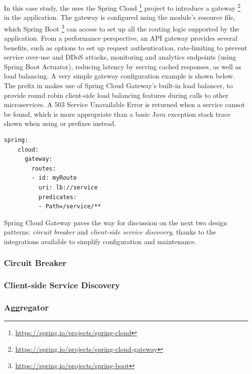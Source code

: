 In this case study, the  uses the Spring Cloud \footnote{\url{https://spring.io/projects/spring-cloud}} project to introduce a gateway \footnote{\url{https://spring.io/projects/spring-cloud-gateway}} in the application. The gateway is configured using the module's  resource file, which Spring Boot \footnote{\url{https://spring.io/projects/spring-boot}} can access to set up all the routing logic supported by the application. From a performance perspective, an API gateway provides several benefits, such as options to set up request authentication, rate-limiting to prevent service over-use and DDoS attacks, monitoring and analytics endpoints (using Spring Boot Actuator), reducing latency by serving cached responses, as well as load balancing. A very simple gateway configuration example is shown below. The  prefix in  makes use of Spring Cloud Gateway's built-in load balancer, to provide round robin client-side load balancing features during calls to other microservices. A 503 Service Unavailable Error is returned when a service cannot be found, which is more appropriate than a basic Java exception stack trace shown when using  or  prefixes instead.

\begin{lstlisting}[caption=Sample Spring Cloud Gateway configuration]
  spring:
    cloud:
      gateway:
        routes:
        - id: myRoute
          uri: lb://service
          predicates:
          - Path=/service/**
\end{lstlisting}

Spring Cloud Gateway paves the way for discussion on the next two design patterns: \textit{circuit breaker} and \textit{client-side service discovery}, thanks to the integrations available to simplify configuration and maintenance.


\subsubsection{Circuit Breaker}

\subsubsection{Client-side Service Discovery}

\subsubsection{Aggregator}

